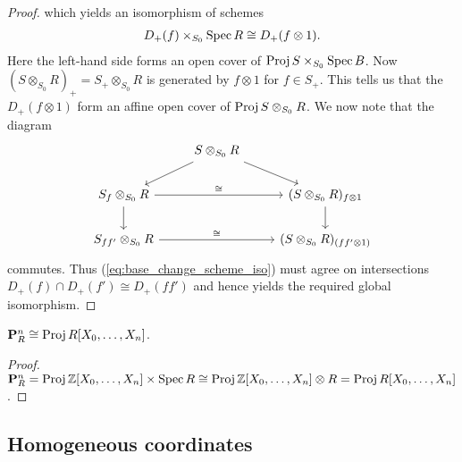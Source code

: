 \documentclass{article}
\begin{document}
\begin{lemma}
\begin{proof}
    which yields an isomorphism of schemes
    \begin{align}\label{eq:base_change_scheme_iso}
      D_+(f) \times_{S_0} \operatorname{Spec} R \cong D_+(f\otimes 1).
    \end{align}
    Here the left-hand side forms an open cover of
    $\operatorname{Proj} S\times_{S_0}\operatorname{Spec} B$. Now
    $(S\otimes_{S_0} R)_+ = S_+\otimes_{S_0} R$ is generated
    by $f\otimes 1$ for $f\in S_+$. This tells us that the
    $D_+(f\otimes 1)$ form an affine open cover of
    $\operatorname{Proj} S\otimes_{S_0} R$. We now note that the
    diagram
    \begin{equation*}
      \begin{tikzcd}
  & {S\otimes_{S_0} R} \\
        {S_f\otimes_{S_0} R} && {(S\otimes_{S_0} R)_{f\otimes 1}} \\
        {S_{ff'}\otimes_{S_0} R} && {(S\otimes_{S_0} R)_{(ff'\otimes 1)}}
        \arrow[from=1-2, to=2-1]
        \arrow[from=1-2, to=2-3]
        \arrow["\cong", from=2-1, to=2-3]
        \arrow["\cong", from=3-1, to=3-3]
        \arrow[from=2-3, to=3-3]
        \arrow[from=2-1, to=3-1]
      \end{tikzcd}
    \end{equation*}
    commutes. Thus (\ref{eq:base_change_scheme_iso}) must agree
    on intersections $D_+(f)\cap D_+(f')\cong D_+(ff')$ and hence
    yields the required global isomorphism.
  \end{proof}
\end{lemma}

\begin{corollary}
  $\mathbf{P}^{n}_{R} \cong \operatorname{Proj} R[X_0,\ldots,X_n]$.
  \begin{proof}
    $\mathbf{P}^{n}_{R} = \operatorname{Proj}\mathbb{Z}[X_0,\ldots,X_n]\times\operatorname{Spec} R
    \cong\operatorname{Proj}\mathbb{Z}[X_0,\ldots,X_n]\otimes R
    = \operatorname{Proj} R[X_0,\ldots,X_n]$.
  \end{proof}
\end{corollary}

\subsection{Homogeneous coordinates}
\end{document}
